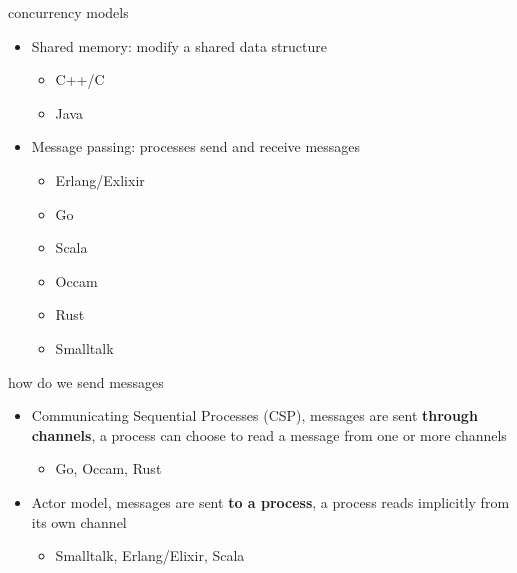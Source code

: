 \begin{frame}{concurrency models}

  \begin{itemize}
  \pause
  \item Shared memory:  modify a shared data structure
    \begin{itemize}
    \item C++/C
    \item Java
    \end{itemize} \pause
  \pause
  \item Message passing: processes send and receive messages
    \begin{itemize}
    \item Erlang/Exlixir 
    \item Go 
    \item Scala 
    \item Occam
    \item Rust
    \item Smalltalk
    \end{itemize}
  \end{itemize}

  \pause
  \vspace{40pt}{\em There are more, but these are the two large groups.}
\end{frame}

\begin{frame}{how do we send messages}

  \begin{itemize}
  \item Communicating Sequential Processes (CSP), messages are sent
    {\bf through channels}, a process can choose to read a message from one
    or more channels \pause
    \begin{itemize}
    \item Go, Occam, Rust
    \end{itemize}
    \pause
    
  \item Actor model, messages are sent {\bf to a process}, a process reads
    implicitly from its own channel \pause
    \begin{itemize}
    \item Smalltalk, Erlang/Elixir,  Scala 
    \end{itemize}    
  \end{itemize}
\end{frame}


